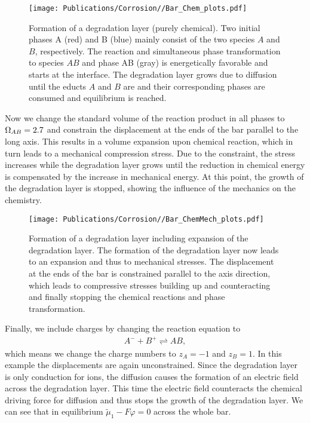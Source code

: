 \begin{figure}[h!]
  \centering
  \texttt{[image: Publications/Corrosion//Bar\_Chem\_plots.pdf]}
  \caption{Formation of a degradation layer (purely chemical). Two initial phases A (red) and B (blue) mainly consist of the two species $A$ and $B$, respectively. The reaction and simultaneous phase transformation to species $AB$ and phase AB (gray) is energetically favorable and starts at the interface. The degradation layer grows due to diffusion until the educts $A$ and $B$ are and their corresponding phases are consumed and equilibrium is reached.}
  \label{fig:BarChem}
\end{figure}

Now we change the standard volume of the reaction product in all phases to $\Omega_{AB}=2.7$ and constrain the displacement at the ends of the bar parallel to the long axis. This results in a volume expansion upon chemical reaction, which in turn leads to a mechanical compression stress. Due to the constraint, the stress increases while the degradation layer grows until the reduction in chemical energy is compensated by the increase in mechanical energy. At this point, the growth of the degradation layer is stopped, showing the influence of the mechanics on the chemistry.  

\begin{figure}[h!]
  \centering
  \texttt{[image: Publications/Corrosion//Bar\_ChemMech\_plots.pdf]}
  \caption{Formation of a degradation layer including expansion of the degradation layer. The formation of the degradation layer now leads to an expansion and thus to mechanical stresses. The displacement at the ends of the bar is constrained parallel to the axis direction, which leads to compressive stresses building up and counteracting and finally stopping the chemical reactions and phase transformation.}
  \label{fig:BarChemMech}
\end{figure}

Finally, we include charges by changing the reaction equation to 
\begin{align}
  A^- + B^+ \rightleftharpoons AB,
\end{align}
which means we change the charge numbers to $z_A=-1$ and $z_B=1$. In this example the displacements are again unconstrained. Since the degradation layer is only conduction for ions, the diffusion causes the formation of an electric field across the degradation layer. This time the electric field counteracts the chemical driving force for diffusion and thus stops the growth of the degradation layer. We can see that in equilibrium $\tilde\mu_1-F\varphi=0$ across the whole bar.  


